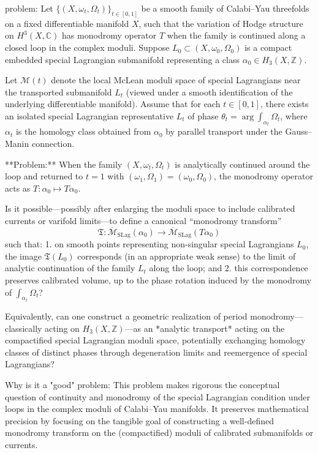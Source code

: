 problem:  
Let \(\{(X, \omega_t, \Omega_t)\}_{t \in [0,1]}\) be a smooth family of Calabi–Yau threefolds on a fixed differentiable manifold \(X\), such that the variation of Hodge structure on \(H^3(X,\mathbb{C})\) has monodromy operator \(T\) when the family is continued along a closed loop in the complex moduli.  
Suppose \(L_0 \subset (X,\omega_0,\Omega_0)\) is a compact embedded special Lagrangian submanifold representing a class \(\alpha_0 \in H_3(X,\mathbb{Z})\).  

Let \(\mathcal{M}(t)\) denote the local McLean moduli space of special Lagrangians near the transported submanifold \(L_t\) (viewed under a smooth identification of the underlying differentiable manifold).  Assume that for each \(t\in [0,1]\), there exists an isolated special Lagrangian representative \(L_t\) of phase \(\theta_t = \arg \int_{\alpha_t}\Omega_t\), where \(\alpha_t\) is the homology class obtained from \(\alpha_0\) by parallel transport under the Gauss–Manin connection.

**Problem:**  
When the family \((X,\omega_t,\Omega_t)\) is analytically continued around the loop and returned to \(t=1\) with \((\omega_1,\Omega_1)=(\omega_0,\Omega_0)\), the monodromy operator acts as \(T:\alpha_0 \mapsto T\alpha_0\).  

Is it possible—possibly after enlarging the moduli space to include calibrated currents or varifold limits—to define a canonical “monodromy transform”  
\[
\mathfrak{T} : \overline{\mathcal{M}}_{\mathrm{SLag}}(\alpha_0) \longrightarrow \overline{\mathcal{M}}_{\mathrm{SLag}}(T\alpha_0)
\]
such that:  
1. on smooth points representing non-singular special Lagrangians \(L_0\), the image \(\mathfrak{T}(L_0)\) corresponds (in an appropriate weak sense) to the limit of analytic continuation of the family \(L_t\) along the loop; and  
2. this correspondence preserves calibrated volume, up to the phase rotation induced by the monodromy of \(\int_{\alpha_t}\Omega_t\)?

Equivalently, can one construct a geometric realization of period monodromy—classically acting on \(H_3(X,\mathbb{Z})\)—as an *analytic transport* acting on the compactified special Lagrangian moduli space, potentially exchanging homology classes of distinct phases through degeneration limits and reemergence of special Lagrangians?

Why is it a "good" problem:  
This problem makes rigorous the conceptual question of continuity and monodromy of the special Lagrangian condition under loops in the complex moduli of Calabi–Yau manifolds.  It preserves mathematical precision by focusing on the tangible goal of constructing a well-defined monodromy transform on the (compactified) moduli of calibrated submanifolds or currents.

